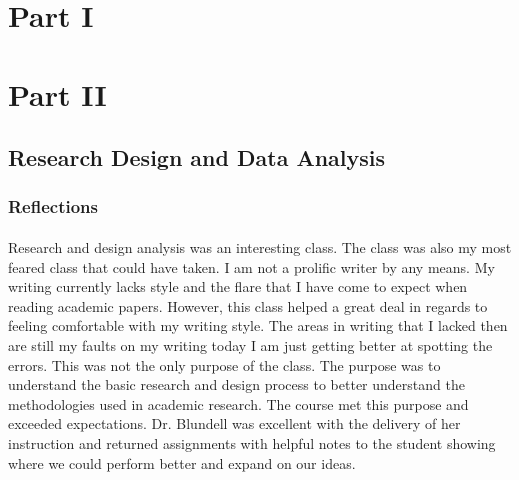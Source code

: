 \documentclass[12pt,titlepage]{article}
\begin{document}
\maketitle
\tableofcontents

\section{Part I}





\section{Part II}
\subsection{Research Design and Data Analysis}
\subsubsection{Reflections}
\paragraph {}
Research and design analysis was an interesting class. The class was also my most feared class that could have taken. I am not a prolific writer by any means. My writing currently lacks style and the flare that I have come to expect when reading academic papers. However, this class helped a great deal in regards to feeling comfortable with my writing style. The areas in writing that I lacked then are still my faults on my writing today I am just getting better at spotting the errors. This was not the only purpose of the class. The purpose was to understand the basic research and design process to better understand the methodologies used in academic research. The course met this purpose and exceeded expectations. Dr. Blundell was excellent with the delivery of her instruction and returned assignments with helpful notes to the student showing where we could perform better and expand on our ideas.
\end{document}

